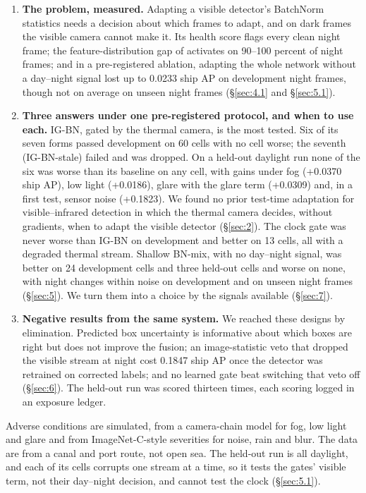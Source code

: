 \documentclass[10pt]{article}
\begin{document}
\begin{enumerate}
\item \textbf{The problem, measured.} Adapting a visible detector's BatchNorm statistics needs a decision about which frames to adapt, and on dark frames the visible camera cannot make it. Its health score flags every clean night frame; the feature-distribution gap of \citet{yoo2024what} activates on 90--100 percent of night frames; and in a pre-registered ablation, adapting the whole network without a day--night signal lost up to 0.0233 ship AP on development night frames, though not on average on unseen night frames (\S\ref{sec:4.1} and \S\ref{sec:5.1}).
\item \textbf{Three answers under one pre-registered protocol, and when to use each.} IG-BN, gated by the thermal camera, is the most tested. Six of its seven forms passed development on 60 cells with no cell worse; the seventh (IG-BN-stale) failed and was dropped. On a held-out daylight run none of the six was worse than its baseline on any cell, with gains under fog (+0.0370 ship AP), low light (+0.0186), glare with the glare term (+0.0309) and, in a first test, sensor noise (+0.1823). We found no prior test-time adaptation for visible--infrared detection in which the thermal camera decides, without gradients, when to adapt the visible detector (\S\ref{sec:2}). The clock gate was never worse than IG-BN on development and better on 13 cells, all with a degraded thermal stream. Shallow BN-mix, with no day--night signal, was better on 24 development cells and three held-out cells and worse on none, with night changes within noise on development and on unseen night frames (\S\ref{sec:5}). We turn them into a choice by the signals available (\S\ref{sec:7}).
\item \textbf{Negative results from the same system.} We reached these designs by elimination. Predicted box uncertainty is informative about which boxes are right but does not improve the fusion; an image-statistic veto that dropped the visible stream at night cost 0.1847 ship AP once the detector was retrained on corrected labels; and no learned gate beat switching that veto off (\S\ref{sec:6}). The held-out run was scored thirteen times, each scoring logged in an exposure ledger.
\end{enumerate}

Adverse conditions are simulated, from a camera-chain model for fog, low light and glare and from ImageNet-C-style severities for noise, rain and blur. The data are from a canal and port route, not open sea. The held-out run is all daylight, and each of its cells corrupts one stream at a time, so it tests the gates' visible term, not their day--night decision, and cannot test the clock (\S\ref{sec:5.1}).
\end{document}
